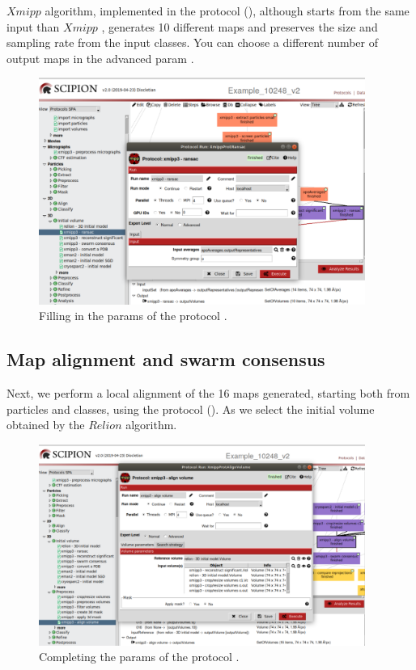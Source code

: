 $Xmipp$  algorithm, implemented in the protocol  (), although starts from the same input than $Xmipp$ , generates 10 different maps and preserves the size and sampling rate from the input  classes. You can choose a different number of output maps in the advanced param .

\begin{figure}[H]
  \centering
  \captionsetup{width=.8\linewidth} 
  \includegraphics[width=0.95\textwidth]
  {images/xmipp_ransac.pdf}
  \caption{Filling in the params of the protocol .}
  \label{fig:xmipp_ransac}
  \end{figure}
  
\subsection*{Map alignment and swarm consensus}
Next, we perform a local alignment of the 16 maps generated, starting both from particles and  classes, using the protocol  (). As  we select the initial volume obtained by the $Relion$ algorithm.

\begin{figure}[H]
  \centering
  \captionsetup{width=.8\linewidth} 
  \includegraphics[width=0.95\textwidth]
  {images/align_volume.pdf}
  \caption{Completing the params of the protocol .}
  \label{fig:align_volume}
  \end{figure}
  

